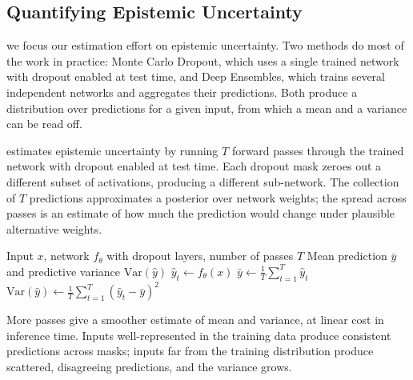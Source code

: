 \subsection{Quantifying Epistemic Uncertainty}


 we focus our estimation effort on epistemic uncertainty.
Two methods do most of the work in practice: Monte Carlo Dropout, which uses a single trained network with dropout enabled at test time, and Deep Ensembles, which trains several independent networks and aggregates their predictions.
Both produce a distribution over predictions for a given input, from which a mean and a variance can be read off.

\cite{GalGhahramani2016} estimates epistemic uncertainty by running $T$ forward passes through the trained network with dropout enabled at test time.
Each dropout mask zeroes out a different subset of activations, producing a different sub-network.
The collection of $T$ predictions approximates a posterior over network weights; the spread across passes is an estimate of how much the prediction would change under plausible alternative weights.

\vspace{1.5em}

\begin{algorithm}[H]
\caption{Monte Carlo Dropout for epistemic uncertainty}
\begin{algorithmic}[1]
\Require Input $x$, network $f_\theta$ with dropout layers, number of passes $T$
\Ensure Mean prediction $\bar{y}$ and predictive variance $\mathrm{Var}(\hat{y})$
    \State $\hat{y}_t \gets f_\theta(x)$ 
\EndFor
\State $\bar{y} \gets \tfrac{1}{T} \sum_{t=1}^{T} \hat{y}_t$
\State $\mathrm{Var}(\hat{y}) \gets \tfrac{1}{T} \sum_{t=1}^{T} (\hat{y}_t - \bar{y})^2$
\end{algorithmic}
\end{algorithm}

More passes give a smoother estimate of mean and variance, at linear cost in inference time.
Inputs well-represented in the training data produce consistent predictions across masks; inputs far from the training distribution produce scattered, disagreeing predictions, and the variance grows.

